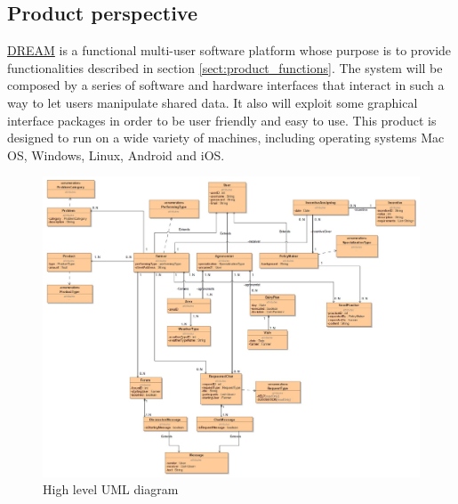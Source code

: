 
\subsection{Product perspective}
\label{sec:prod_perspective}
\hyperref[tab:acronymsTable]{DREAM} is a functional multi-user software platform whose purpose is to provide functionalities described in section \ref{sect:product_functions}. The system will be composed by a series of software and hardware interfaces that interact in such a way to let users manipulate shared data. It also will exploit some graphical interface packages in order to be user friendly and easy to use.
This product is designed to run on a wide variety of machines, including operating systems Mac OS, Windows, Linux, Android and iOS. 

\begin{figure}[H]
	\centering
    \includegraphics[page=1, width=\textwidth]{Images/uml.JPG}
	\caption{\label{fig:uml_class_diagram}High level UML diagram}
\end{figure}


